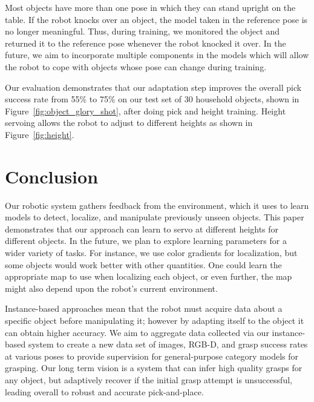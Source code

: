 \documentclass[conference,onecolumn]{IEEEtran}
\begin{document}
Most objects have more than one pose in which they can stand upright
on the table. If the robot knocks over an object, the model taken in
the reference pose is no longer meaningful. Thus, during training, we
monitored the object and returned it to the reference pose whenever
the robot knocked it over. In the future, we aim to incorporate
multiple components in the models which will allow the robot to cope
with objects whose pose can change during training.

Our evaluation demonstrates that our adaptation step improves the
overall pick success rate from 55\% to 75\% on our test set of 30
household objects, shown in Figure~\ref{fig:object_glory_shot}, after
doing pick and height training.  Height servoing allows the robot to
adjust to different heights as shown in Figure~\ref{fig:height}.

\section*{Conclusion}

Our robotic system gathers feedback from the environment, which it
uses to learn models to detect, localize, and manipulate previously
unseen objects.  This paper demonstrates that our approach can learn
to servo at different heights for different objects.  In the future,
we plan to explore learning parameters for a wider variety of tasks.
For instance, we use color gradients for localization,
but some objects would work better with other quantities. One could
learn the appropriate map to use when localizing each object, or even
further, the map might also depend upon the robot's current
environment.

Instance-based approaches mean that the robot must acquire data about
a specific object before manipulating it; however by adapting itself
to the object it can obtain higher accuracy.  We aim to aggregate data
collected via our instance-based system to create a new data set of
images, RGB-D, and grasp success rates at various poses to provide
supervision for general-purpose category models for grasping.  Our
long term vision is a system that can infer high quality grasps for
any object, but adaptively recover if the initial grasp attempt is
unsuccessful, leading overall to robust and accurate pick-and-place.



\end{document}

